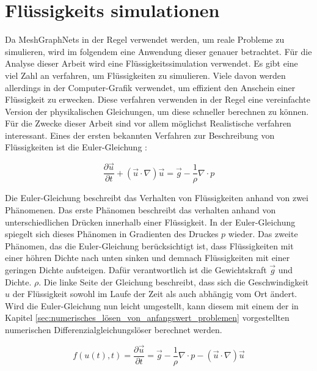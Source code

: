 
\section{Flüssigkeits simulationen} \label{sec:simulationen}

Da MeshGraphNets in der Regel verwendet werden, um reale Probleme zu simulieren, 
wird im folgendem eine Anwendung dieser genauer betrachtet.
Für die Analyse dieser Arbeit wird eine Flüssigkeitssimulation verwendet.
Es gibt eine viel Zahl an verfahren, um Flüssigkeiten zu simulieren.
Viele davon werden allerdings in der Computer-Grafik verwendet, um 
effizient den Anschein einer Flüssigkeit zu erwecken.
Diese verfahren verwenden in der Regel eine vereinfachte Version der physikalischen Gleichungen,
um diese schneller berechnen zu können.
Für die Zwecke dieser Arbeit sind vor allem möglichst Realistische verfahren interessant.
Eines der ersten bekannten Verfahren zur Beschreibung von Flüssigkeiten ist die Euler-Gleichung \cite[Kapitel~1]{navier_stokes}:

$$
\frac{\partial \vec{u}}{\partial t} + (\vec{u} \cdot \nabla) \vec{u} =  \vec{g} - \frac{1}{\rho} \nabla \cdot p
$$

Die Euler-Gleichung beschreibt das Verhalten von Flüssigkeiten anhand von zwei Phänomenen.
Das erste Phänomen beschreibt das verhalten anhand von unterschiedlichen Drücken innerhalb einer Flüssigkeit.
In der Euler-Gleichung spiegelt sich dieses Phänomen in Gradienten des Druckes $p$ wieder.
Das zweite Phänomen, das die Euler-Gleichung berücksichtigt ist, dass Flüssigkeiten mit
einer höhren Dichte nach unten sinken und demnach Flüssigkeiten mit einer geringen Dichte aufsteigen.
Dafür verantwortlich ist die Gewichtskraft $\vec{g}$ und Dichte. $\rho$.
Die linke Seite der Gleichung beschreibt, dass sich die Geschwindigkeit $u$ der Flüssigkeit sowohl im Laufe 
der Zeit als auch abhängig vom Ort ändert.
Wird die Euler-Gleichung nun leicht umgestellt, kann diesem mit einem der in Kapitel \ref{sec:numerisches_lösen_von_anfangswert_problemen} vorgestellten 
numerischen Differenzialgleichungslöser berechnet werden.

$$
f(u(t), t) = \frac{\partial \vec{u}}{\partial t}  =  \vec{g} - \frac{1}{\rho} \nabla \cdot p -  (\vec{u} \cdot \nabla) \vec{u}
$$

